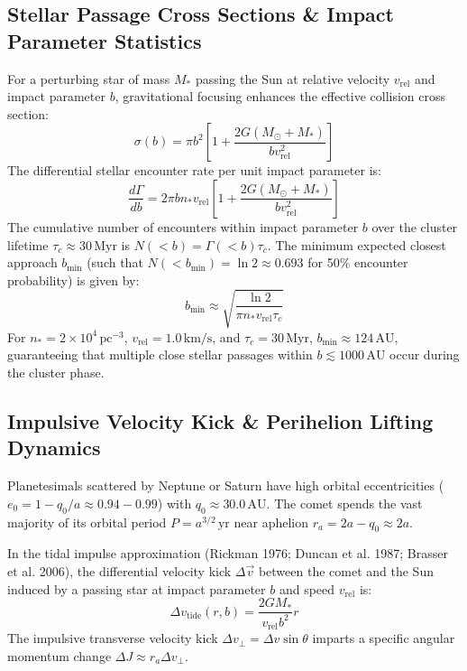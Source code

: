 \documentclass[11pt,a4paper]{article}
\begin{document}
\subsection{Stellar Passage Cross Sections \& Impact Parameter Statistics}
For a perturbing star of mass $M_*$ passing the Sun at relative velocity $v_{\text{rel}}$ and impact parameter $b$, gravitational focusing enhances the effective collision cross section:
\begin{equation}
\sigma(b) = \pi b^2 \left[ 1 + \frac{2 G (M_\odot + M_*)}{b v_{\text{rel}}^2} \right]
\label{eq:cross_sec}
\end{equation}
The differential stellar encounter rate per unit impact parameter is:
\begin{equation}
\frac{d\Gamma}{db} = 2 \pi b n_* v_{\text{rel}} \left[ 1 + \frac{2 G (M_\odot + M_*)}{b v_{\text{rel}}^2} \right]
\label{eq:dgamma_db}
\end{equation}
The cumulative number of encounters within impact parameter $b$ over the cluster lifetime $\tau_c \approx 30\,\text{Myr}$ is $N(<b) = \Gamma(<b) \tau_c$. The minimum expected closest approach $b_{\text{min}}$ (such that $N(<b_{\text{min}}) = \ln 2 \approx 0.693$ for 50\% encounter probability) is given by:
\begin{equation}
b_{\text{min}} \approx \sqrt{\frac{\ln 2}{\pi n_* v_{\text{rel}} \tau_c}}
\label{eq:b_min}
\end{equation}
For $n_* = 2 \times 10^4\,\text{pc}^{-3}$, $v_{\text{rel}} = 1.0\,\text{km/s}$, and $\tau_c = 30\,\text{Myr}$, $b_{\text{min}} \approx 124\,\text{AU}$, guaranteeing that multiple close stellar passages within $b \lesssim 1000\,\text{AU}$ occur during the cluster phase.

\subsection{Impulsive Velocity Kick \& Perihelion Lifting Dynamics}
Planetesimals scattered by Neptune or Saturn have high orbital eccentricities ($e_0 = 1 - q_0/a \approx 0.94 - 0.99$) with $q_0 \approx 30.0\,\text{AU}$. The comet spends the vast majority of its orbital period $P = a^{3/2}\,\text{yr}$ near aphelion $r_a = 2a - q_0 \approx 2a$.

In the tidal impulse approximation (Rickman 1976; Duncan et al. 1987; Brasser et al. 2006), the differential velocity kick $\Delta \vec{v}$ between the comet and the Sun induced by a passing star at impact parameter $b$ and speed $v_{\text{rel}}$ is:
\begin{equation}
\Delta v_{\text{tide}}(r, b) = \frac{2 G M_*}{v_{\text{rel}} b^2} r
\label{eq:delta_v}
\end{equation}
The impulsive transverse velocity kick $\Delta v_\perp = \Delta v \sin\theta$ imparts a specific angular momentum change $\Delta J \approx r_a \Delta v_\perp$.
\end{document}
